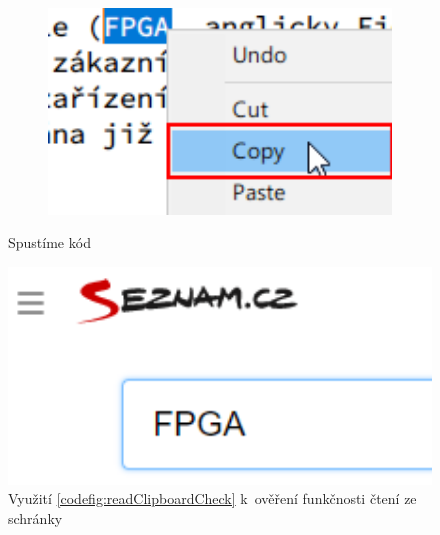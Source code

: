 \documentclass[12pt, a4paper, twoside]{article}
\begin{document}
 	\begin{figure}[H]
 		\centering
 	\begin{minipage}{0.3\textwidth}
 		\begin{subfigure}[t]{1.0\textwidth}
 			\includegraphics[width=1.0\textwidth]{textSelection.png}
 		\end{subfigure}	
 	\end{minipage}
 	\hfill
 	\textrightarrow
 	\hfill
 	\begin{minipage}{0.18\textwidth}
		\begin{adjustwidth}{0.2cm}{0.0cm}
			Spustíme kód
		\end{adjustwidth}
 	\end{minipage}
  	\hfill
	 \textrightarrow
	 \hfill
 	\begin{minipage}{0.3\textwidth}
 		\includegraphics[width=1.0\textwidth]{clipboardReadTest.png}
    \end{minipage}
	\caption{Využití \cref{codefig:readClipboardCheck} k~ověření funkčnosti čtení ze schránky}
  	\end{figure}
  
\end{document}
